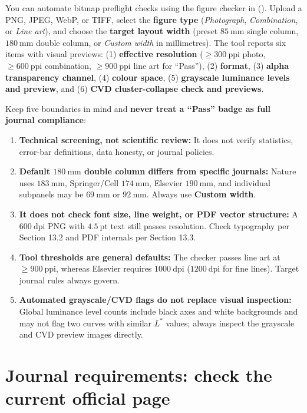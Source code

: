 You can automate bitmap preflight checks using the figure checker in \scidraw{} (). Upload a PNG, JPEG, WebP, or TIFF, select the \textbf{figure type} (\textit{Photograph}, \textit{Combination}, or \textit{Line art}), and choose the \textbf{target layout width} (preset $85\ \text{mm}$ single column, $180\ \text{mm}$ double column, or \textit{Custom width} in millimetres). The tool reports six items with visual previews: (1) \textbf{effective resolution} ($\ge 300\ \text{ppi}$ photo, $\ge 600\ \text{ppi}$ combination, $\ge 900\ \text{ppi}$ line art for ``Pass''), (2) \textbf{format}, (3) \textbf{alpha transparency channel}, (4) \textbf{colour space}, (5) \textbf{grayscale luminance levels and preview}, and (6) \textbf{CVD cluster-collapse check and previews}.

Keep five boundaries in mind and \textbf{never treat a ``Pass'' badge as full journal compliance}:
\begin{enumerate}
\item \textbf{Technical screening, not scientific review:} It does not verify statistics, error-bar definitions, data honesty, or journal policies.
\item \textbf{Default $180\ \text{mm}$ double column differs from specific journals:} Nature uses $183\ \text{mm}$, Springer/Cell $174\ \text{mm}$, Elsevier $190\ \text{mm}$, and individual subpanels may be $69\ \text{mm}$ or $92\ \text{mm}$. Always use \textbf{Custom width}.
\item \textbf{It does not check font size, line weight, or PDF vector structure:} A $600\ \text{dpi}$ PNG with $4.5\ \text{pt}$ text still passes resolution. Check typography per Section 13.2 and PDF internals per Section 13.3.
\item \textbf{Tool thresholds are general defaults:} The checker passes line art at $\ge 900\ \text{ppi}$, whereas Elsevier requires $1000\ \text{dpi}$ ($1200\ \text{dpi}$ for fine lines). Target journal rules always govern.
\item \textbf{Automated grayscale/CVD flags do not replace visual inspection:} Global luminance level counts include black axes and white backgrounds and may not flag two curves with similar $L^*$ values; always inspect the grayscale and CVD preview images directly.
\end{enumerate}

\section{Journal requirements: check the current official page}

